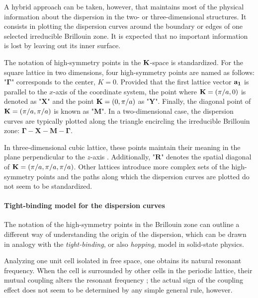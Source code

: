 A hybrid approach can be taken, however, that maintains most of the physical information about the dispersion in the two- or three-dimensional structures. It consists in plotting the  dispersion curves around the boundary or edges of one selected irreducible Brillouin zone. It is expected that no important information is lost by leaving out its inner surface.

The notation of high-symmetry points in the ${\mathbf{K}}$-space is standardized. For the square lattice in two dimensions, four high-symmetry points are named as follows: "$\mathbf{\Gamma}$" corresponds to the center, $K=0$. Provided that the first lattice vector ${\mathbf{a_1}}$ is parallel to the $x$-axis of the coordinate system, the point where ${\mathbf{K}} = (\pi/a, 0)$ is denoted as  "$\mathbf{X}$" and the point ${\mathbf{K}} = (0, \pi/a)$ as "$\mathbf{Y}$". Finally, the diagonal point of ${\mathbf{K}} = (\pi/a, \pi/a)$ is known as "$\mathbf{M}$".
In a two-dimensional case, the dispersion curves are typically plotted along the triangle encircling the irreducible Brillouin zone: $\mathbf{\Gamma}-\mathbf{X}-\mathbf{M}-\mathbf{\Gamma}$.

In three-dimensional cubic lattice, these points maintain their meaning in the plane perpendicular to the $z$-axis \cite[p. 99]{klingshirn2007semiconductor}. Additionally, "$\mathbf{R}$" denotes the spatial diagonal of ${\mathbf{K}} = (\pi/a, \pi/a, \pi/a)$. Other lattices introduce more complex sets of the high-symmetry points and the paths along which the dispersion curves are plotted do not seem to be standardized.

\paragraph{Tight-binding model for the dispersion curves} %
The notation of the high-symmetry points in the Brillouin zone can outline a different way \cite{shi2007} of understanding the origin of the dispersion, which can be drawn in analogy with the \textit{tight-binding},   %
or also \textit{hopping},  %
model in solid-state physics. 

\label{tight-binding}
Analyzing one unit cell isolated in free space, one obtains its natural resonant frequency.  When the cell is surrounded by other cells in the periodic lattice, their mutual coupling alters the resonant frequency \cite[p. 75]{klingshirn2007semiconductor}; the actual sign of the coupling effect does not seem to be determined by any simple general rule, however.	


